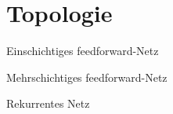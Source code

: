 \documentclass[aspectratio=169,usepdftitle=true]{beamer}
\begin{document}
\section{Topologie}
\begin{frame}{Einschichtiges feedforward-Netz}
    \begin{layout-imageonly}
    \centering
    \feedforwardNetwork
    \end{layout-imageonly}
\end{frame}

\begin{frame}{Mehrschichtiges feedforward-Netz}
    \begin{layout-imageonly}
    \centering
    \deepfeedforwardNetwork
    \end{layout-imageonly}
\end{frame}

\begin{frame}{Rekurrentes Netz}
    \begin{layout-imageonly}
    \centering
    \recursiveNetwork
    \end{layout-imageonly}
\end{frame}
\end{document}
